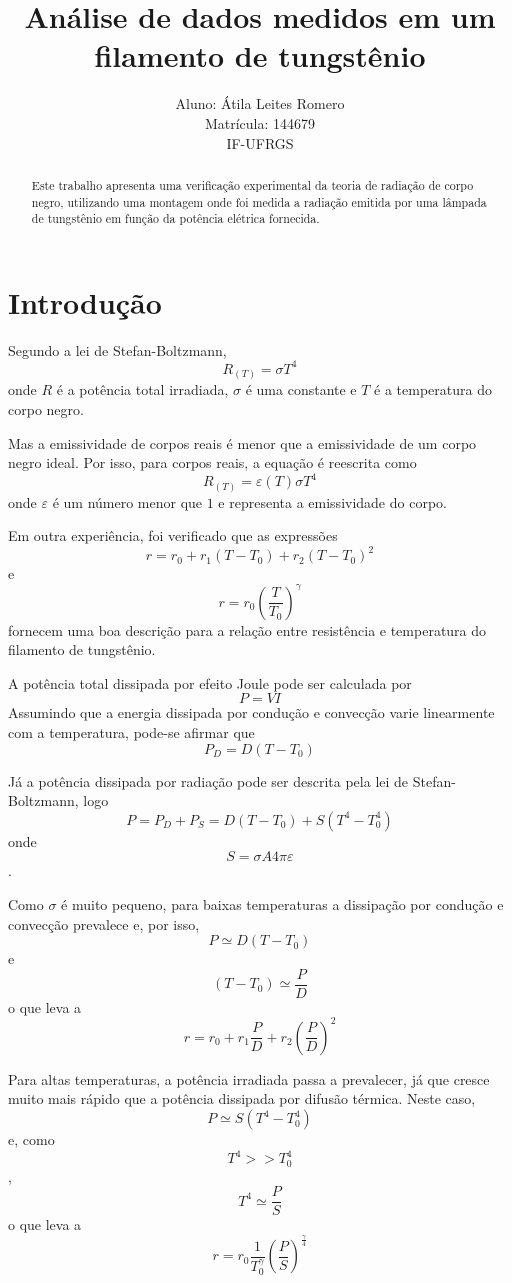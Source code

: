 \documentclass[brazilian,12pt,a4paper,final]{article}
\title{Análise de dados medidos em um filamento de tungstênio}
\author{Aluno: Átila Leites Romero \\ Matrícula: 144679 \\ IF-UFRGS}
\begin{document}
\maketitle

\begin{abstract}
Este trabalho apresenta uma verificação experimental da teoria de radiação de corpo negro, 
utilizando uma montagem onde foi medida a radiação emitida por uma lâmpada de tungstênio 
em função da potência elétrica fornecida.
\end{abstract}

\section{Introdução}
Segundo a lei de Stefan-Boltzmann,
$$ R_{(T)}=\sigma T^4$$
onde $R$ é a potência total irradiada, $\sigma$ é uma constante 
e $T$ é a temperatura do corpo negro. 

Mas a emissividade de corpos reais é menor que a emissividade de um corpo negro ideal.
Por isso, para corpos reais, a equação é reescrita como 
$$ R_{(T)}=\varepsilon (T)\sigma T^4$$
onde $\varepsilon$ é um número menor que $1$ e representa a emissividade do corpo.

Em outra experiência, foi verificado que as expressões
$$r=r_0+r_1(T-T_0)+r_2(T-T_0)^2$$ 
e 
$$r=r_0(\frac{T}{T_0})^\gamma$$
fornecem uma boa descrição para a
relação entre resistência e temperatura do filamento de tungstênio.

A potência total dissipada por efeito Joule pode ser calculada por 
$$P=VI$$ 
Assumindo que a energia dissipada por condução e convecção varie linearmente 
com a temperatura, pode-se afirmar que 
$$P_D=D(T-T_0)$$

Já a potência dissipada por radiação pode ser descrita pela lei de Stefan-Boltzmann, 
logo 
$$P=P_D+P_S=D(T-T_0)+S(T^4-T_0^4)$$
onde 
$$S=\sigma A 4\pi\varepsilon$$.

Como $\sigma$ é muito pequeno, 
para baixas temperaturas a dissipação por condução e convecção prevalece e,
por isso, 
$$P\simeq D(T-T_0)$$ 
e 
$$(T-T_0)\simeq \frac{P}{D}$$
o que leva a 
$$r=r_0+r_1\frac{P}{D}+r_2(\frac{P}{D})^2$$

Para altas temperaturas, a potência irradiada passa a prevalecer, 
já que cresce muito mais rápido que a potência dissipada por difusão térmica.
Neste caso,  
$$P\simeq S(T^4-T_0^4)$$ 
e, como 
$$T^4>>T_0^4$$, 
$$T^4\simeq \frac{P}{S}$$
o que leva a 
$$r=r_0\frac{1}{T_0^\gamma}(\frac{P}{S})^\frac{\gamma}{4}$$
\end{document}
